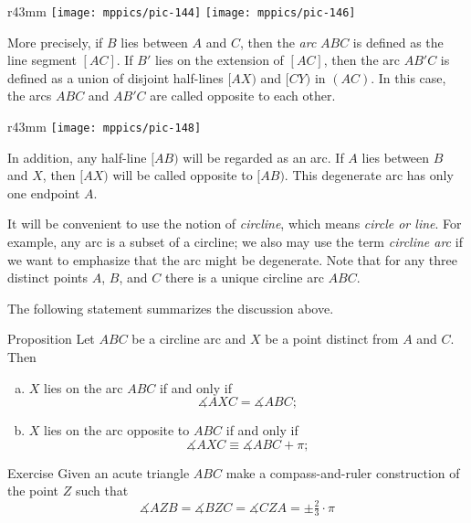 \begin{wrapfigure}{r}{43mm}
\vskip-2mm
\centering
\texttt{[image: mppics/pic-144]}
\vskip4mm
\texttt{[image: mppics/pic-146]}
\end{wrapfigure}

More precisely,  if $B$ lies between $A$ and $C$, then the \emph{arc} $ABC$ is defined as 
the line segment $[AC]$.
If $B'$ lies on the extension of $[AC]$,
then the arc $AB'C$ is defined as a union of disjoint half-lines $[AX)$ and $[CY)$ in $(AC)$.
In this case, the arcs $ABC$ and $AB'C$ are called opposite to each other.

\begin{wrapfigure}{r}{43mm}
\vskip-2mm
\centering
\texttt{[image: mppics/pic-148]}
\end{wrapfigure}

In addition, any half-line $[AB)$ will be regarded as an arc.
If $A$ lies between $B$ and $X$, then $[AX)$ will be called opposite to $[AB)$.
This degenerate arc has only one endpoint $A$.

It will be convenient to use the notion of 
\emph{circline},
which means {}\emph{circle or line}.
For example, any arc is a subset of a circline;
we also may use the term \emph{circline arc} if we want to emphasize that the arc might be degenerate.
Note that for any three distinct points $A$, $B$, and $C$ there is a unique circline arc $ABC$.

The following statement summarizes the discussion above.

\begin{thm}{Proposition}\label{prop:arcs}
Let $ABC$ be a circline arc and $X$ be a point distinct from $A$ and $C$.
Then 
\begin{enumerate}[(a)]
\item $X$ lies on the arc $ABC$ if and only if 
 \[\measuredangle AXC=\measuredangle ABC;\]
\item $X$ lies on the arc opposite to $ABC$ if and only if 
 \[\measuredangle AXC\equiv\measuredangle ABC+\pi;\]
\end{enumerate}
\end{thm}

\begin{thm}{Exercise}\label{ex:3x120}
Given an acute triangle $ABC$
make a compass-and-ruler construction of the point $Z$ such that
\[\measuredangle AZB
= \measuredangle BZC
= \measuredangle CZA
=\pm\tfrac23\cdot\pi\]

\end{thm}

